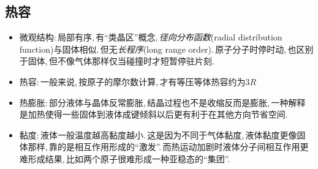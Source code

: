 \subsection{热容}


\begin{itemize}
	\item 微观结构:\,局部有序,\,有``类晶区''概念,\,\emph{径向分布函数}(radial distribution function)与固体相似.\,但无\emph{长程序}(long range order).\,原子分子时停时动,\,也区别于固体,\,但不像气体那样仅当碰撞时才短暂停驻片刻.
	\item 热容:\,一般来说,\,按原子的摩尔数计算,\,才有等压等体热容约为$3R$
	\item 热膨胀:\,部分液体与晶体反常膨胀,\,结晶过程也不是收缩反而是膨胀,\,一种解释是加热使得一些固体到液体成键倾斜以后更有利于在其他方向节省空间.
	\item 黏度:\,液体一般温度越高黏度越小.\,这是因为不同于气体黏度,\,液体黏度更像固体那样,\,靠的是相互作用形成的``激发''.\,而热运动加剧时液体分子间相互作用更难形成结果,\,比如两个原子很难形成一种亚稳态的``集团''.
\end{itemize}




